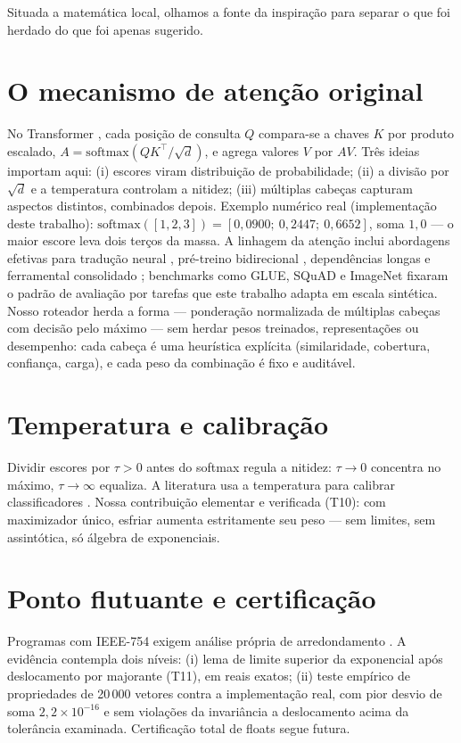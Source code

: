 Situada a matemática local, olhamos a fonte da inspiração para separar o que foi herdado do que foi apenas sugerido.
\section{O mecanismo de atenção original}
No Transformer \cite{vaswani2017}, cada posição de consulta $Q$ compara-se a chaves $K$ por produto escalado, $A=\mathrm{softmax}(QK^\top/\sqrt{d})$, e agrega valores $V$ por $AV$. Três ideias importam aqui: (i) escores viram distribuição de probabilidade; (ii) a divisão por $\sqrt{d}$ e a temperatura controlam a nitidez; (iii) múltiplas cabeças capturam aspectos distintos, combinados depois. Exemplo numérico real (implementação deste trabalho): $\mathrm{softmax}([1,2,3])=[0{,}0900;\ 0{,}2447;\ 0{,}6652]$, soma $1{,}0$ --- o maior escore leva dois terços da massa. A linhagem da atenção inclui abordagens efetivas para tradução neural \cite{luong2015}, pré-treino bidirecional \cite{devlin2019}, dependências longas \cite{dai2019} e ferramental consolidado \cite{wolf2020}; benchmarks como GLUE, SQuAD e ImageNet \cite{wang2018,rajpurkar2016,deng2009} fixaram o padrão de avaliação por tarefas que este trabalho adapta em escala sintética. Nosso roteador herda a forma --- ponderação normalizada de múltiplas cabeças com decisão pelo máximo --- sem herdar pesos treinados, representações ou desempenho: cada cabeça é uma heurística explícita (similaridade, cobertura, confiança, carga), e cada peso da combinação é fixo e auditável.
\section{Temperatura e calibração}
Dividir escores por $\tau>0$ antes do softmax regula a nitidez: $\tau\to0$ concentra no máximo, $\tau\to\infty$ equaliza. A literatura usa a temperatura para calibrar classificadores \cite{komisarenko2024,xuan2025,xie2024}. Nossa contribuição elementar e verificada (T10): com maximizador único, esfriar aumenta estritamente seu peso --- sem limites, sem assintótica, só álgebra de exponenciais.
\section{Ponto flutuante e certificação}
Programas com IEEE-754 exigem análise própria de arredondamento \cite{bagnara2019,murray2026}. A evidência contempla dois níveis: (i) lema de limite superior da exponencial após deslocamento por majorante (T11), em reais exatos; (ii) teste empírico de propriedades de 20\,000 vetores contra a implementação real, com pior desvio de soma $2{,}2\times10^{-16}$ e sem violações da invariância a deslocamento acima da tolerância examinada. Certificação total de floats segue futura.
